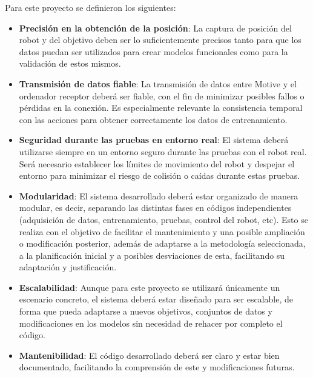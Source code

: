 \begin{itemize}
    Para este proyecto se definieron los siguientes:

    \begin{itemize}
        \item \textbf{Precisión en la obtención de la posición}:
        La captura de posición del robot y del objetivo deben ser lo suficientemente precisos tanto para que los datos puedan ser utilizados para crear modelos 
        funcionales como para la validación de estos mismos.

        \item \textbf{Transmisión de datos fiable}:
        La transmisión de datos entre Motive y el ordenador receptor deberá ser fiable, con el fin de minimizar posibles fallos o pérdidas en la conexión. 
        Es especialmente relevante la consistencia temporal con las acciones para obtener correctamente los datos de entrenamiento.

        \item \textbf{Seguridad durante las pruebas en entorno real}: 
        El sistema deberá utilizarse siempre en un entorno seguro durante las pruebas con el robot real. Será necesario establecer los límites de movimiento del 
        robot y despejar el entorno para minimizar el riesgo de colisión o caídas durante estas pruebas.

        \item \textbf{Modularidad}:
        El sistema desarrollado deberá estar organizado de manera modular, es decir, separando las distintas fases en códigos independientes (adquisición de 
        datos, entrenamiento, pruebas, control del robot, etc). Esto se realiza con el objetivo de facilitar el mantenimiento y una posible ampliación o modificación 
        posterior, además de adaptarse a la metodología seleccionada, a la planificación inicial y a posibles desviaciones de esta, facilitando su adaptación 
        y justificación.

        \item \textbf{Escalabilidad}:
        Aunque para este proyecto se utilizará únicamente un escenario concreto, el sistema deberá estar diseñado para ser escalable, de forma que pueda 
        adaptarse a nuevos objetivos, conjuntos de datos y modificaciones en los modelos sin necesidad de rehacer por completo el código.

        \item \textbf{Mantenibilidad}:
        El código desarrollado deberá ser claro y estar bien documentado, facilitando la comprensión de este y modificaciones futuras.


\end{itemize}
\end{itemize}
